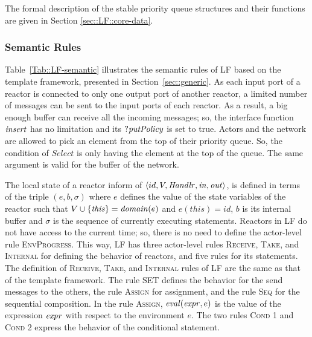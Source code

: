 The formal description of the stable priority queue structures and their functions are given in Section \ref{sec::LF::core-data}.




\subsubsection{Semantic Rules}
Table~\ref{Tab::LF-semantic} illustrates the semantic rules of LF based on the template framework, presented in  Section~\ref{sec::generic}. As each input port of a reactor is connected to only one output port of another reactor, a limited number of messages can be sent to the input ports of each reactor. As a result, a big enough buffer can receive all the incoming messages; so, the interface function $\mathit{insert}$ has no limitation and its $?{\it putPolicy}$ is set to true. Actors and the network are allowed to pick an element from the top of their priority queue. So, the condition of $Select$ is only having the element at the top of the queue. The same argument is valid for the buffer of the network.

The local state of a reactor inform of $\langle id, V, \mathit{Handlr}, \mathit{in}, \mathit{out}\rangle$, is defined in terms of the triple $(e,b, \sigma)$ where $e$ defines the value of the state variables of the reactor such that $V\cup\{\mathit{this}\}=\mathit{domain}(e)$ and $e(\mathit{this})=id$, $b$ is its internal buffer and $\sigma$ is the sequence of currently executing statements. Reactors in LF do not have access to the current time; so, there is no need to define the actor-level rule \textsc{EnvProgress}. This way, LF has three actor-level rules \textsc{Receive}, \textsc{Take}, and \textsc{Internal} for defining the behavior of reactors, and five rules for its statements. The definition of \textsc{Receive}, \textsc{Take}, and \textsc{Internal} rules of LF are the same as that of the template framework. The rule \textsc{SET} defines the behavior for the send messages to the others, the rule \textsc{Assign} for assignment, and the rule \textsc{Seq} for the sequential composition. In the rule \textsc{Assign}, $\mathit{eval}(\mathit{expr},e)$ is the value of the expression $\mathit{expr}$ with respect to the environment $e$. The two rules \textsc{Cond 1} and \textsc{Cond 2} express the behavior of the conditional statement.


